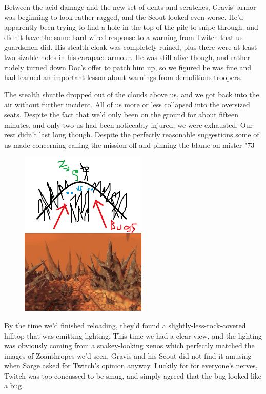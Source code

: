 Between the acid damage and the new set of dents and scratches, Gravis' armor was beginning to look rather ragged, and the Scout looked even worse. 
He'd apparently been trying to find a hole in the top of the pile to snipe through, and didn't have the same hard-wired response to a warning from Twitch that us guardsmen did. 
His stealth cloak was completely ruined, plus  there were at least two sizable holes in his carapace armour. 
He was still alive though, and rather rudely turned down Doc's offer to patch him up, so we figured he was fine and had learned an important lesson about warnings from demolitions troopers.

The stealth shuttle dropped out of the clouds above us, and we got back into the air without further incident. 
All of us more or less collapsed into the oversized seats. 
Despite the fact that we'd only been on the ground for about fifteen minutes, and only two us had been noticeably injured, we were exhausted. 
Our rest didn't last long though. 
Despite the perfectly reasonable suggestions some of us made concerning calling the mission off and pinning the blame on mister "73%

\begin{figure}
	\begin{center}
		\includegraphics[width=\figwidth]{pics/12/41.png}
	\end{center}
\end{figure}
By the time we'd finished reloading, they'd found a slightly-less-rock-covered hilltop that was emitting lighting. 
 This time we had a clear view, and the lighting was obviously coming from a snakey-looking xenos which perfectly matched the images of Zoanthropes we'd seen. 
Gravis and his Scout did not find it amusing when Sarge asked for Twitch's opinion anyway. 
Luckily for for everyone's nerves, Twitch was too concussed to be smug, and simply agreed that the bug looked like a bug.

